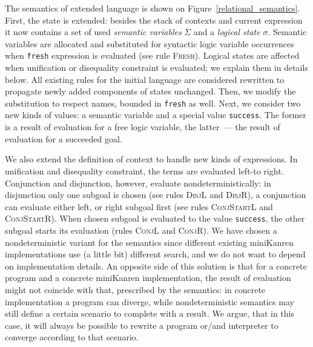 The semantics of extended language is shown on Figure~\ref{relational_semantics}. First, the state is extended: besides the stack of contexts and
current expression it now contains a set of used \emph{semantic variables} $\Sigma$ and a \emph{logical state} $\sigma$. 
Semantic variables are allocated and substituted for syntactic logic variable occurrences when \lstinline|fresh| expression is evaluated 
(see rule \textsc{Fresh}). Logical states are affected when unification or disequality constraint is evaluated; we explain them
in details below. All existing rules for the initial language are considered rewritten to propagate newly added components of states unchanged.
Then, we modify the substitution to respect names, bounded in \lstinline|fresh| as well. 
Next, we consider two new kinds of values: a semantic variable and a special value \lstinline|success|. The former is a result of evaluation for
a free logic variable, the latter~--- the result of evaluation for a succeeded goal.

We also extend the definition of context to handle new kinds of expressions. In unification and disequality constraint, the terms are evaluated left-to right.
Conjunction and disjunction, however, evaluate nondeterministically: in disjunction only one subgoal is chosen (see rules \textsc{DisjL} and \textsc{DisjR}),
a conjunction can evaluate either left, or right subgoal first (see rules \textsc{ConjStartL} and \textsc{ConjStartR}). When chosen subgoal is evaluated
to the value \lstinline|success|, the other subgoal starts its evaluation (rules \textsc{ConjL} and \textsc{ConjR}).
We have chosen a nondeterministic variant for the semantics since different existing miniKanren implementations use (a little bit) different search, and we do 
not want to depend on implementation details. An opposite side of this solution is that for a concrete program and a concrete miniKanren implementation,
the result of evaluation might not coincide with that, prescribed by the semantics: in concrete implementation a program can diverge, while
nondeterministic semantics may still define a certain scenario to complete with a result. We argue, that in this case, it will always be possible to
rewrite a program or/and interpreter to converge according to that scenario.


